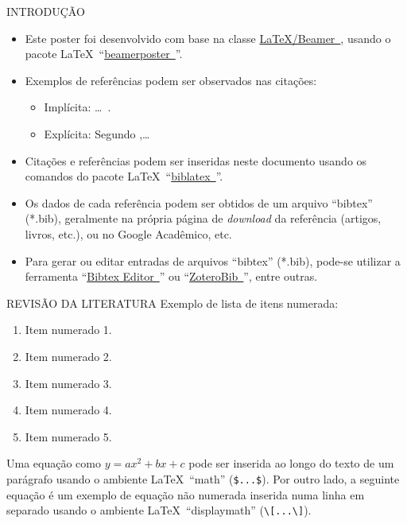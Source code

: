 \documentclass[%
  final,%
  english,%
  brazilian,%
]{beamer}
\begin{document}
\begin{frame}[t, fragile = singleslide]
\begin{columns}[t, onlytextwidth]
%
\begin{column}{0.49\textwidth}
%
\begin{block}{INTRODUÇÃO}
\begin{itemize}
\item Este poster foi desenvolvido com base na classe \href{http://www.ctan.org/pkg/beamer/}{\LaTeX/Beamer~\linkicon}, usando o pacote \LaTeX\ \enquote{\href{http://ctan.org/pkg/beamerposter/}{beamerposter~\linkicon}}.
\item Exemplos de referências podem ser observados nas citações:
\begin{itemize}
\item Implícita: \ldots\ \cite{Lamport1994,VanEkenstein1997}.
\item Explícita: Segundo \textcite{Wizentier1992},\ldots
\end{itemize}
\item Citações e referências podem ser inseridas neste documento usando os comandos do pacote \LaTeX\ \enquote{\href{http://ctan.org/pkg/biblatex/}{biblatex~\linkicon}}.
\item Os dados de cada referência podem ser obtidos de um arquivo \enquote{bibtex} (*.bib), geralmente na própria página de \textit{download} da referência (artigos, livros, etc.), ou no Google Acadêmico, etc.
\item Para gerar ou editar entradas de arquivos \enquote{bibtex} (*.bib), pode-se utilizar a ferramenta \enquote{\href{http://truben.no/latex/bibtex/}{Bibtex Editor~\linkicon}} ou \enquote{\href{http://zbib.org/}{ZoteroBib~\linkicon}}, entre outras.
\end{itemize}
\end{block}
%
\begin{block}{REVISÃO DA LITERATURA}
Exemplo de lista de itens numerada:
\begin{enumerate}
\item Item numerado 1.
\item Item numerado 2.
\item Item numerado 3.
\item Item numerado 4.
\item Item numerado 5.
\end{enumerate}
Uma equação como $y = a x^2 + b x + c$ pode ser inserida ao longo do texto de um parágrafo usando o ambiente \LaTeX\ \enquote{math} (\verb|$...$|).
Por outro lado, a seguinte equação é um exemplo de equação não numerada inserida numa linha em separado usando o ambiente \LaTeX\ \enquote{displaymath} (\verb|\[...\]|).

\end{block}
\end{column}
\end{columns}
\end{frame}
\end{document}

